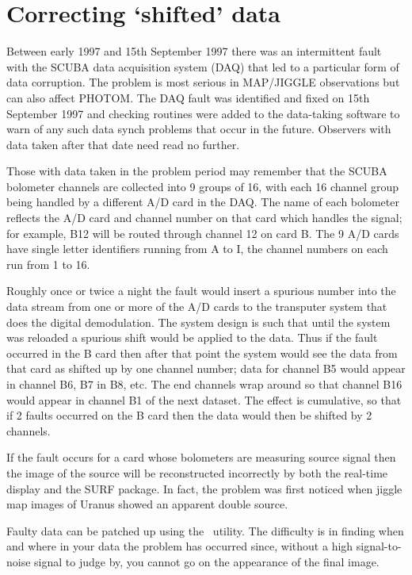 \documentclass[twoside,11pt]{starlink}
\providecommand{\task}[1]{#1}
\providecommand{\scushift}{\htmlref{\task{scushift}}{SCUSHIFT}}
\begin{document}
\section{Correcting `shifted' data}

Between early 1997 and 15th September 1997 there was an intermittent fault
with the SCUBA data acquisition system (DAQ) that led to a particular form of
data corruption. The problem is most serious in MAP/JIGGLE observations but
can also affect PHOTOM. The DAQ fault was identified and fixed on 15th
September 1997 and checking routines were added to the data-taking software to
warn of any such data synch problems that occur in the future.  Observers with
data taken after that date need read no further.

Those with data taken in the problem period may remember that the
SCUBA bolometer channels are collected into 9 groups of 16, with each 16
channel group being handled by a different A/D card in the DAQ. The name
of each bolometer reflects the A/D card and channel number on that card
which handles the signal; for example, B12 will be routed through channel
12 on card B. The 9 A/D cards have single letter identifiers running from
A to I, the channel numbers on each run from 1 to 16.

Roughly once or twice a night the fault would insert a spurious number
into the data stream from one or more of the A/D cards to the transputer
system that does the digital demodulation. The system design is such that
until the system was reloaded a spurious shift would be applied to the
data. Thus if the fault occurred in the B card then after that point the
system would see the data from that card as shifted up by one channel
number; data for channel B5 would appear in channel B6, B7 in B8, etc. The
end channels wrap around so that channel B16 would appear in channel B1 of
the next dataset. The effect is cumulative, so that if 2 faults occurred
on the B card then the data would then be shifted by 2 channels.

If the fault occurs for a card whose bolometers are measuring source
signal then the image of the source will be reconstructed incorrectly by
both the real-time display and the SURF package. In fact, the problem was
first noticed when jiggle map images of Uranus showed an apparent double
source.

Faulty data can be patched up using the \scushift\  utility. The difficulty is
in finding when and where in your data the problem has occurred since,
without a high signal-to-noise signal to judge by, you cannot go on the
appearance of the final image.
\end{document}
